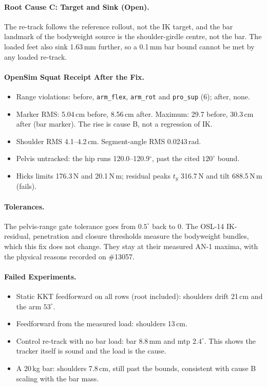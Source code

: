 \documentclass[11pt,a4paper]{article}
\begin{document}
\paragraph{Root Cause C: Target and Sink (Open).} The re-track follows the
reference rollout, not the IK target, and the bar landmark of the bodyweight
source is the shoulder-girdle centre, not the bar. The loaded feet also sink
1.63\,mm further, so a 0.1\,mm bar bound cannot be met by any loaded re-track.

\paragraph{OpenSim Squat Receipt After the Fix.}
\begin{itemize}[nosep]
\item Range violations: before, \texttt{arm\_flex}, \texttt{arm\_rot} and
  \texttt{pro\_sup} (6); after, none.
\item Marker RMS: 5.04\,cm before, 8.56\,cm after. Maximum: 29.7 before,
  30.3\,cm after (bar marker). The rise is cause B, not a regression of IK.
\item Shoulder RMS 4.1--4.2\,cm. Segment-angle RMS 0.0243\,rad.
\item Pelvis untracked: the hip runs 120.0--120.9$^\circ$, past the cited
  $120^\circ$ bound.
\item Hicks limits 176.3\,N and 20.1\,N\,m; residual peaks $t_y$ 316.7\,N and
  tilt 688.5\,N\,m (fails).
\end{itemize}

\paragraph{Tolerances.} The pelvis-range gate tolerance goes from
$0.5^\circ$ back to 0. The OSL-14 IK-residual, penetration and closure
thresholds measure the bodyweight bundles, which this fix does not change. They
stay at their measured AN-1 maxima, with the physical reasons recorded on
\#13057.

\paragraph{Failed Experiments.}
\begin{itemize}[nosep]
\item Static KKT feedforward on all rows (root included): shoulders drift
  21\,cm and the arm $53^\circ$.
\item Feedforward from the measured load: shoulders 13\,cm.
\item Control re-track with no bar load: bar 8.8\,mm and mtp $2.4^\circ$.
  This shows the tracker itself is sound and the load is the cause.
\item A 20\,kg bar: shoulders 7.8\,cm, still past the bounds, consistent with
  cause B scaling with the bar mass.
\end{itemize}
\end{document}
